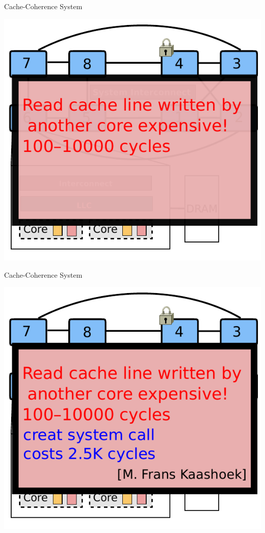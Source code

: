 \documentclass[english]{beamer} %
\begin{document}
\begin{frame}{Cache-Coherence System}
\begin{center}
\includegraphics[scale=0.8]{fig/archcache_1_1}
\end{center}
\end{frame}


\begin{frame}{Cache-Coherence System}
\begin{center}
\includegraphics[scale=0.8]{fig/archcache_1_2}
\end{center}
\end{frame}
\end{document}
